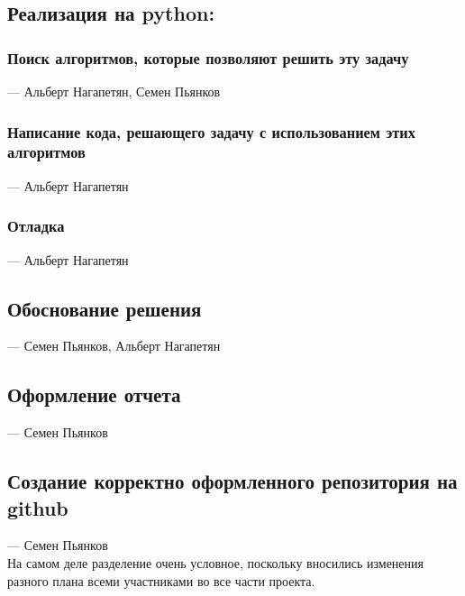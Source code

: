 \documentclass{article}
\begin{document}
\subsection{Реализация на python:}
    \subsubsection{Поиск алгоритмов, которые позволяют решить эту задачу} --- Альберт Нагапетян, Семен Пьянков
    \subsubsection{Написание кода, решающего задачу с использованием этих алгоритмов} --- Альберт Нагапетян
    \subsubsection{Отладка} --- Альберт Нагапетян %
\subsection{Обоснование решения} --- Семен Пьянков, Альберт Нагапетян
\subsection{Оформление отчета} --- Семен Пьянков
\subsection{Создание корректно оформленного репозитория на github} --- Семен Пьянков\\

На самом деле разделение очень условное, поскольку вносились изменения разного плана всеми участниками во все части проекта.\\
\end{document}
